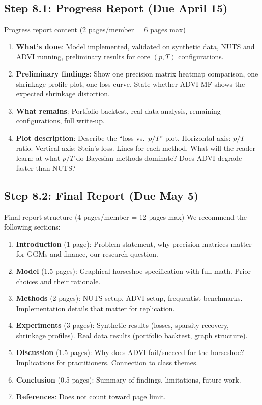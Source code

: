 \documentclass[11pt,a4paper]{article}
\begin{document}
\subsection{Step 8.1: Progress Report (Due April 15)}

\begin{action}{Progress report content (2 pages/member = 6 pages max)}
\begin{enumerate}
  \item \textbf{What's done}: Model implemented, validated on synthetic data, NUTS and ADVI running, preliminary results for core $(p,T)$ configurations.
  \item \textbf{Preliminary findings}: Show one precision matrix heatmap comparison, one shrinkage profile plot, one loss curve. State whether ADVI-MF shows the expected shrinkage distortion.
  \item \textbf{What remains}: Portfolio backtest, real data analysis, remaining configurations, full write-up.
  \item \textbf{Plot description}: Describe the ``loss vs.\ $p/T$'' plot. Horizontal axis: $p/T$ ratio. Vertical axis: Stein's loss. Lines for each method. What will the reader learn: at what $p/T$ do Bayesian methods dominate? Does ADVI degrade faster than NUTS?
\end{enumerate}
\end{action}

\subsection{Step 8.2: Final Report (Due May 5)}

\begin{action}{Final report structure (4 pages/member = 12 pages max)}
We recommend the following sections:
\begin{enumerate}
  \item \textbf{Introduction} (1 page): Problem statement, why precision matrices matter for GGMs and finance, our research question.
  \item \textbf{Model} (1.5 pages): Graphical horseshoe specification with full math. Prior choices and their rationale.
  \item \textbf{Methods} (2 pages): NUTS setup, ADVI setup, frequentist benchmarks. Implementation details that matter for replication.
  \item \textbf{Experiments} (3 pages): Synthetic results (losses, sparsity recovery, shrinkage profiles). Real data results (portfolio backtest, graph structure).
  \item \textbf{Discussion} (1.5 pages): Why does ADVI fail/succeed for the horseshoe? Implications for practitioners. Connection to class themes.
  \item \textbf{Conclusion} (0.5 pages): Summary of findings, limitations, future work.
  \item \textbf{References}: Does not count toward page limit.
\end{enumerate}
\end{action}
\end{document}
